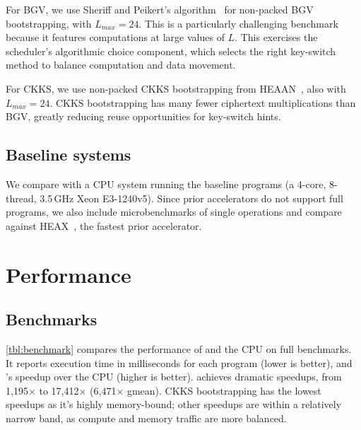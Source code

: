 For BGV, we use Sheriff and Peikert's algorithm~\cite{alperin:crypto13:practical} for non-packed BGV bootstrapping, with $L_{max} = 24$.
This is a particularly challenging benchmark because it features computations at large values of $L$.
This exercises the scheduler's algorithmic choice component, which selects
the right key-switch method to balance computation and data movement.


For CKKS, we use non-packed CKKS bootstrapping from HEAAN~\cite{cheon:eurocrypt2018:bootstrapping}, also with $L_{max} = 24$.
CKKS bootstrapping has many fewer ciphertext multiplications than BGV, greatly reducing
reuse opportunities for key-switch hints.



\subsection{Baseline systems}
We compare \name with a CPU system running the baseline programs (a 4-core, 8-thread, 3.5\,GHz Xeon E3-1240v5).
Since prior accelerators do not support full programs, we also include microbenchmarks of single operations
and compare against HEAX~\cite{riazi:asplos20:heax}, the fastest prior accelerator.

\vspace{-0.1in}
\section{Performance} \label{sec:evaluation}

\subsection{Benchmarks}

\tblBenchmark

\autoref{tbl:benchmark} compares the performance of \name and the CPU on full benchmarks.
It reports execution time in milliseconds for each program (lower is better), and \name's speedup over the CPU (higher is better).
\name achieves dramatic speedups, from 1,195$\times$ to 17,412$\times$ (6,471$\times$ gmean).
CKKS bootstrapping has the lowest speedups as it's highly memory-bound;
other speedups are within a relatively narrow band, as compute and memory traffic are more balanced.

